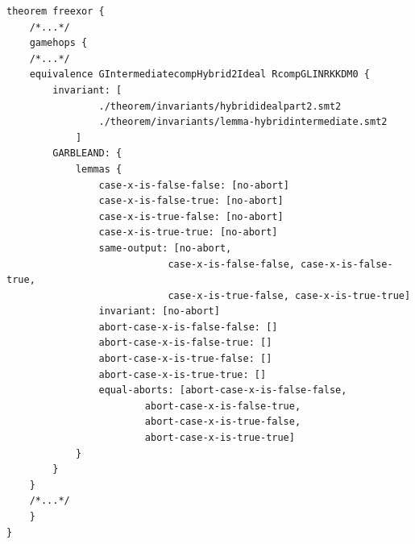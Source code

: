 \begin{longlisting}
\begin{verbatim}
theorem freexor {
    /*...*/
    gamehops {
    /*...*/
    equivalence GIntermediatecompHybrid2Ideal RcompGLINRKKDM0 {
        invariant: [
                ./theorem/invariants/hybrididealpart2.smt2
                ./theorem/invariants/lemma-hybridintermediate.smt2
            ]
        GARBLEAND: {
            lemmas {
                case-x-is-false-false: [no-abort]
                case-x-is-false-true: [no-abort]
                case-x-is-true-false: [no-abort]
                case-x-is-true-true: [no-abort]
                same-output: [no-abort, 
                            case-x-is-false-false, case-x-is-false-true,
                            case-x-is-true-false, case-x-is-true-true]
                invariant: [no-abort]
                abort-case-x-is-false-false: []
                abort-case-x-is-false-true: []
                abort-case-x-is-true-false: []
                abort-case-x-is-true-true: []
                equal-aborts: [abort-case-x-is-false-false, 
                        abort-case-x-is-false-true, 
                        abort-case-x-is-true-false, 
                        abort-case-x-is-true-true]
            }
        }
    }
    /*...*/
    }
}
\end{verbatim}
\caption{Game hop 7 in the  theorem}
\label{lst:domino-freexor-gamehop6}
\end{longlisting}